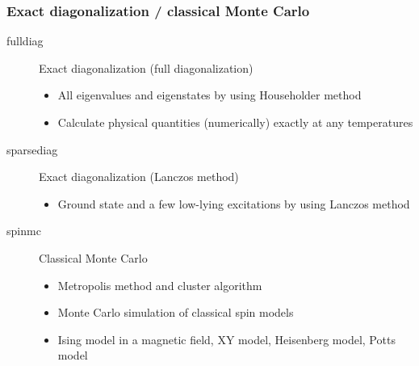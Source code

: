 \begin{frame}[t,fragile]
  \frametitle{Exact diagonalization / classical Monte Carlo}
  \begin{description}
  \item[fulldiag] Exact diagonalization (full diagonalization)
    \begin{itemize}
    \item All eigenvalues and eigenstates by using Householder method
    \item Calculate physical quantities (numerically) exactly at any temperatures
    \end{itemize}
  \item[sparsediag] Exact diagonalization (Lanczos method)
    \begin{itemize}
    \item Ground state and a few low-lying excitations by using Lanczos method
    \end{itemize}
  \item[spinmc] Classical Monte Carlo
    \begin{itemize}
      \item Metropolis method and cluster algorithm
      \item Monte Carlo simulation of classical spin models
      \item Ising model in a magnetic field, XY model, Heisenberg model, Potts model
    \end{itemize}
  \end{description}
\end{frame}

